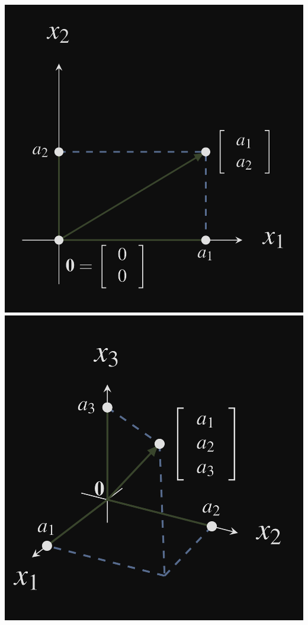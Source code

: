 \documentclass[pdf,9pt]{beamer}
\begin{document}
\begin{frame}[fragile]
    \includegraphics[scale=0.11]{R2.png}
    \hfill
    \includegraphics[scale=0.1]{R3.png}
\end{frame}
\end{document}
